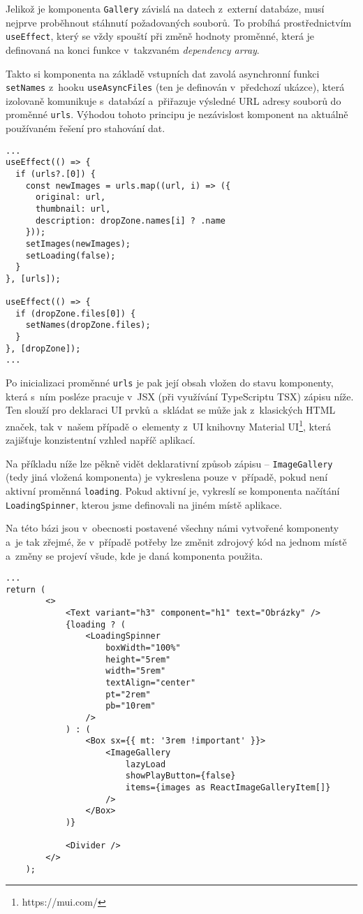 Jelikož je komponenta \verb|Gallery| závislá na datech z~externí databáze, musí nejprve proběhnout stáhnutí požadovaných souborů. To probíhá prostřednictvím \verb|useEffect|, který se vždy spouští při změně hodnoty proměnné, která je definovaná na konci funkce v~takzvaném \emph{dependency array}.

Takto si komponenta na základě vstupních dat zavolá asynchronní funkci \verb|setNames| z~hooku \verb|useAsyncFiles| (ten je definován v~předchozí ukázce), která izolovaně komunikuje s~databází a~přiřazuje výsledné URL adresy souborů do proměnné \verb|urls|. Výhodou tohoto principu je nezávislost komponent na aktuálně používaném řešení pro stahování dat.

\begin{verbatim}
...
useEffect(() => {
  if (urls?.[0]) {
    const newImages = urls.map((url, i) => ({
      original: url,
      thumbnail: url,
      description: dropZone.names[i] ? .name
    }));
    setImages(newImages);
    setLoading(false);
  }
}, [urls]);

useEffect(() => {
  if (dropZone.files[0]) {
    setNames(dropZone.files);
  }
}, [dropZone]);
...
\end{verbatim}

Po inicializaci proměnné \verb|urls| je pak její obsah vložen do stavu komponenty, která s~ním posléze pracuje v~JSX (při využívání TypeScriptu TSX) zápisu níže. Ten slouží pro deklaraci UI prvků a~skládat se může jak z~klasických HTML značek, tak v~našem případě o~elementy z~UI knihovny Material UI\footnote{https://mui.com/}, která zajišťuje konzistentní vzhled napříč aplikací.

Na příkladu níže lze pěkně vidět deklarativní způsob zápisu -- \verb|ImageGallery| (tedy jiná vložená komponenta) je vykreslena pouze v~případě, pokud není aktivní proměnná \verb|loading|. Pokud aktivní je, vykreslí se komponenta načítání \verb|LoadingSpinner|, kterou jsme definovali na jiném místě aplikace.

Na této bázi jsou v~obecnosti postavené všechny námi vytvořené komponenty a~je tak zřejmé, že v~případě potřeby lze změnit zdrojový kód na jednom místě a~změny se projeví všude, kde je daná komponenta použita.

\begin{verbatim}
...
return (
        <>
            <Text variant="h3" component="h1" text="Obrázky" />
            {loading ? (
                <LoadingSpinner
                    boxWidth="100%"
                    height="5rem"
                    width="5rem"
                    textAlign="center"
                    pt="2rem"
                    pb="10rem"
                />
            ) : (
                <Box sx={{ mt: '3rem !important' }}>
                    <ImageGallery
                        lazyLoad
                        showPlayButton={false}
                        items={images as ReactImageGalleryItem[]}
                    />
                </Box>
            )}

            <Divider />
        </>
    );
\end{verbatim}

